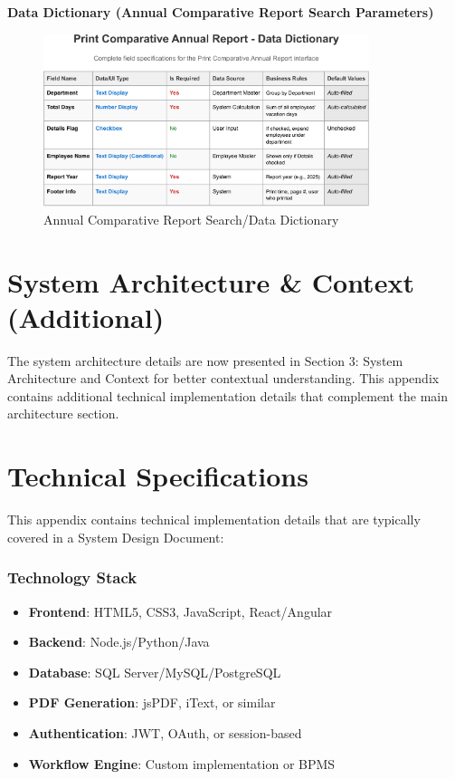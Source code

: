 \documentclass[12pt,a4paper]{article}
\begin{document}
\noindent\textbf{Data Dictionary (Annual Comparative Report Search Parameters)}
\begin{figure}[H]
\centering
\includegraphics[width=0.85\textwidth]{Data-Dictionary/Screen-Data-Dictionaries/Print-Comparative-Annual-Report-Data-Dictionary/Print-Comparative-Annual-Report-Data-Dictionary-1.png}
\caption{Annual Comparative Report Search/Data Dictionary}
\label{fig:annual-comparative-report-search-data-dict-inline}
\end{figure}




\section{System Architecture \& Context (Additional)}
The system architecture details are now presented in Section 3: System Architecture and Context for better contextual understanding. This appendix contains additional technical implementation details that complement the main architecture section.

\section{Technical Specifications}
This appendix contains technical implementation details that are typically covered in a System Design Document:

\subsubsection{Technology Stack}
\begin{itemize}
    \item \textbf{Frontend}: HTML5, CSS3, JavaScript, React/Angular
    \item \textbf{Backend}: Node.js/Python/Java
    \item \textbf{Database}: SQL Server/MySQL/PostgreSQL
    \item \textbf{PDF Generation}: jsPDF, iText, or similar
    \item \textbf{Authentication}: JWT, OAuth, or session-based
    \item \textbf{Workflow Engine}: Custom implementation or BPMS
\end{itemize}
\end{document}
